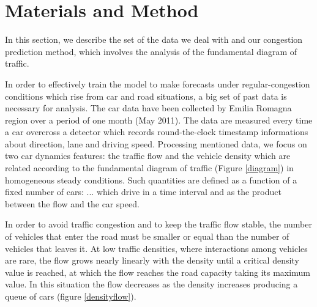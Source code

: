 \documentclass[a4paper,12pt]{article}
\begin{document}
\section{Materials and Method}
In this section, we describe the set of the data we deal with and our congestion prediction method, which involves the analysis of the fundamental diagram of traffic.

In order to effectively train the model to make forecasts under regular-congestion conditions which rise from car and road situations, a big set of past data is necessary for analysis. The car data have been collected by Emilia Romagna region over a period of one month (May 2011). The data are measured every time a car overcross a detector which records round-the-clock timestamp informations about direction, lane and driving speed. Processing mentioned data, we focus on two car dynamics features: the traffic flow and the vehicle density which are related according to the fundamental diagram of traffic (Figure \ref{diagram}) in homogeneous steady conditions.
Such quantities are defined as a function of a fixed number of cars: ...  which drive in a time interval and as the product between the flow and the car speed.

In order to avoid traffic congestion and to keep the traffic flow stable, the number of vehicles that enter the road must be smaller or equal than the number of vehicles that leaves it. At low traffic densities, where interactions among vehicles are rare, the flow grows nearly linearly with the density until a critical density value is reached, at which the flow reaches the road capacity taking its maximum value. In this situation the flow decreases as the density increases producing a queue of cars (figure \ref{densityflow}). 

\end{document}
